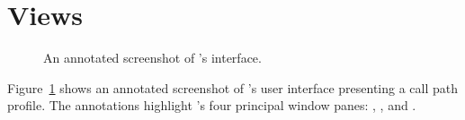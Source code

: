 \section{Views}

\begin{figure}[t]
\caption{An annotated screenshot of \hpctraceviewer{}'s interface.}
\label{fig:hpctraceviewer-legend}
\end{figure}

Figure~\ref{fig:hpctraceviewer-legend} shows an annotated screenshot of \hpctraceviewer{}'s user interface presenting a call path profile.
The annotations highlight \hpctraceviewer{}'s four principal window panes: \traceview, \depthview, \callview{} and \miniview.

